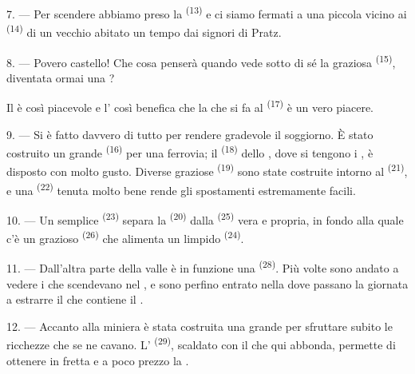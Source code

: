 7. --- Per scendere abbiamo preso la  \textsuperscript{(13)} e ci
siamo fermati a una piccola  vicino ai 
\textsuperscript{(14)} di un vecchio  abitato un tempo dai
signori di Pratz.

8. --- Povero castello! Che cosa penserà quando vede sotto di sé la graziosa
 \textsuperscript{(15)}, diventata ormai una ?

Il  è così piacevole e l' così benefica che la
 che si fa al  \textsuperscript{(17)} è un vero piacere.

\VUsaut{3.0mm}
\VUsaut{3.0mm}

9. --- Si è fatto davvero di tutto per rendere gradevole il soggiorno. È stato
costruito un grande  \textsuperscript{(16)} per una ferrovia; il
 \textsuperscript{(18)} dello , dove si tengono i
, è disposto con molto gusto. Diverse graziose 
\textsuperscript{(19)} sono state costruite intorno al 
\textsuperscript{(21)}, e una  \textsuperscript{(22)} tenuta molto bene
rende gli spostamenti estremamente facili.

10. --- Un semplice  \textsuperscript{(23)} separa la
 \textsuperscript{(20)} dalla  \textsuperscript{(25)} vera
e propria, in fondo alla quale c'è un grazioso 
\textsuperscript{(26)} che alimenta un limpido 
\textsuperscript{(24)}.

11. --- Dall'altra parte della valle è in funzione una 
\textsuperscript{(28)}. Più volte sono andato a vedere i  che
scendevano nel , e sono perfino entrato nella  dove
passano la giornata a estrarre il  che contiene il .

12. --- Accanto alla miniera è stata costruita una grande  per
sfruttare subito le ricchezze che se ne cavano. L'
\textsuperscript{(29)}, scaldato con il  che qui abbonda, permette di
ottenere in fretta e a poco prezzo la .

